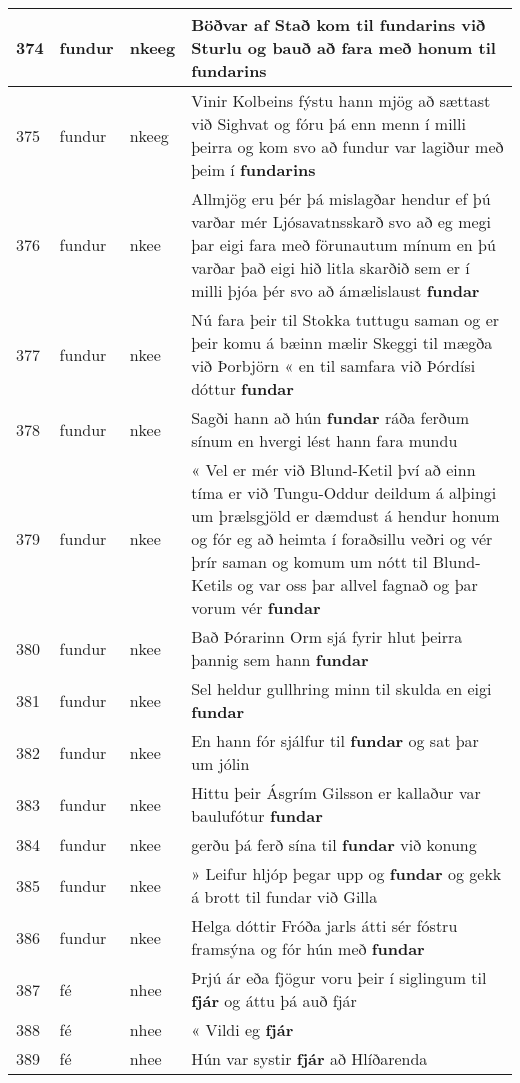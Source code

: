 \documentclass{article}
\begin{document}
\begin{longtable}{p{1cm}|p{1cm}|p{1cm}|p{13cm}}
\hline
374&fundur&nkeeg&Böðvar af Stað kom til \textbf{fundarins} við Sturlu og bauð að fara með honum til fundarins\\
\hline
375&fundur&nkeeg&Vinir Kolbeins fýstu hann mjög að sættast við Sighvat og fóru þá enn menn í milli þeirra og kom svo að fundur var lagiður með þeim í \textbf{fundarins} \\
\hline
376&fundur&nkee&Allmjög eru þér þá mislagðar hendur ef þú varðar mér Ljósavatnsskarð svo að eg megi þar eigi fara með förunautum mínum en þú varðar það eigi hið litla skarðið sem er í milli þjóa þér svo að ámælislaust \textbf{fundar} \\
\hline
377&fundur&nkee&Nú fara þeir til Stokka tuttugu saman og er þeir komu á bæinn mælir Skeggi til mægða við Þorbjörn « en til samfara við Þórdísi dóttur \textbf{fundar} \\
\hline
378&fundur&nkee&Sagði hann að hún \textbf{fundar} ráða ferðum sínum en hvergi lést hann fara mundu\\
\hline
379&fundur&nkee&« Vel er mér við Blund-Ketil því að einn tíma er við Tungu-Oddur deildum á alþingi um þrælsgjöld er dæmdust á hendur honum og fór eg að heimta í foraðsillu veðri og vér þrír saman og komum um nótt til Blund-Ketils og var oss þar allvel fagnað og þar vorum vér \textbf{fundar} \\
\hline
380&fundur&nkee&Bað Þórarinn Orm sjá fyrir hlut þeirra þannig sem hann \textbf{fundar} \\
\hline
381&fundur&nkee&Sel heldur gullhring minn til skulda en eigi \textbf{fundar} \\
\hline
382&fundur&nkee&En hann fór sjálfur til \textbf{fundar} og sat þar um jólin\\
\hline
383&fundur&nkee&Hittu þeir Ásgrím Gilsson er kallaður var baulufótur \textbf{fundar} \\
\hline
384&fundur&nkee&gerðu þá ferð sína til \textbf{fundar} við konung\\
\hline
385&fundur&nkee&» Leifur hljóp þegar upp og \textbf{fundar} og gekk á brott til fundar við Gilla\\
\hline
386&fundur&nkee&Helga dóttir Fróða jarls átti sér fóstru framsýna og fór hún með \textbf{fundar} \\
\hline
387&fé&nhee&Þrjú ár eða fjögur voru þeir í siglingum til \textbf{fjár} og áttu þá auð fjár\\
\hline
388&fé&nhee&« Vildi eg \textbf{fjár} \\
\hline
389&fé&nhee&Hún var systir \textbf{fjár} að Hlíðarenda\\

\end{longtable}
\end{document}
